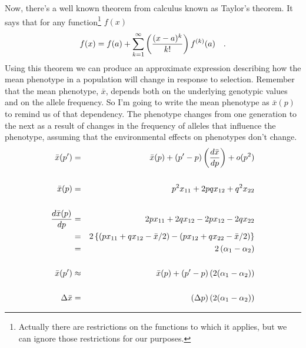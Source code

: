 Now, there's a well known theorem from calculus known as Taylor's
theorem. It says that for any function\footnote{Actually there are
  restrictions on the functions to which it applies, but we can ignore
  those restrictions for our purposes.} $f(x)$
\[
f(x) = f(a) + \sum_{k=1}^\infty \left({{(x-a)^k} \over k!}\right)
                                 f^{(k)}(a) \quad .
\]
Using this theorem we can produce an approximate expression describing
how the mean phenotype in a population will change in response to
selection. Remember that the mean phenotype, $\bar x$, depends both on
the underlying genotypic values and on the allele frequency. So I'm
going to write the mean phenotype as $\bar x(p)$ to remind us of that
dependency. The phenotype changes from one generation to the next as a
result of changes in the frequency of alleles that influence the
phenotype, assuming that the environmental effects on phenotypes don't
change.
\begin{eqnarray*}
{\bar x}(p') &=& {\bar x}(p) + (p' - p)\left({d{\bar x} \over dp}\right)
             + o(p^2) \\
\\
{\bar x}(p) &=& p^2x_{11} + 2pqx_{12} + q^2x_{22} \\
\\
\frac{d{\bar x(p)}}{dp}
         &=& 2px_{11} + 2qx_{12} - 2px_{12} - 2qx_{22} \\
         &=& 2\left\{
             \left(px_{11} + qx_{12} - {\bar x}/2\right) -
             \left(px_{12} + qx_{22} - {\bar x}/2\right)\right\} \\
         &=& 2\left(\alpha_1 - \alpha_2\right) \\
\\
{\bar x}(p') &\approx& {\bar x}(p) + (p' - p)\left(2(\alpha_1 - \alpha_2)\right) \\
\\
\Delta{\bar x} &=& (\Delta p)\left(2(\alpha_1 - \alpha_2)\right)
\end{eqnarray*}

